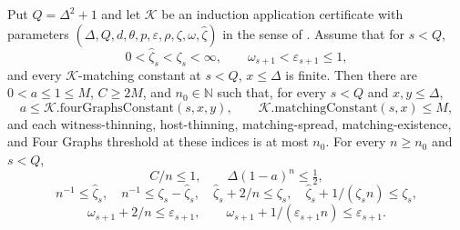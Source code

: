 \begin{lemma}
Put $Q=\Delta^2+1$ and let $\mathcal K$ be an induction application
certificate with parameters
$(\Delta,Q,d,\theta,p,\varepsilon,\rho,\zeta,\omega,\widehat\zeta)$
in the sense of .
Assume that for $s<Q$,
\[
 0<\widehat\zeta_s<\zeta_s<\infty,\qquad
 \omega_{s+1}<\varepsilon_{s+1}\leq1,
\]
and every $\mathcal K$-matching constant at $s<Q$, $x\leq\Delta$ is
finite. Then there are $0<a\leq1\leq M$, $C\geq2M$, and
$n_0\in\mathbb N$ such that, for every $s<Q$ and $x,y\leq\Delta$,
\[
 a\leq\mathcal K.\mathrm{fourGraphsConstant}(s,x,y),\qquad
 \mathcal K.\mathrm{matchingConstant}(s,x)\leq M,
\]
and each witness-thinning, host-thinning, matching-spread,
matching-existence, and Four Graphs threshold at these indices is at
most $n_0$. For every $n\geq n_0$ and $s<Q$,
\[
 C/n\leq1,\qquad \Delta(1-a)^n\leq\tfrac12,
\]
\[
 n^{-1}\leq\widehat\zeta_s,\quad
 n^{-1}\leq\zeta_s-\widehat\zeta_s,\quad
 \widehat\zeta_s+2/n\leq\zeta_s,\quad
 \widehat\zeta_s+1/(\zeta_s n)\leq\zeta_s,
\]
\[
 \omega_{s+1}+2/n\leq\varepsilon_{s+1},\qquad
 \omega_{s+1}+1/(\varepsilon_{s+1}n)\leq\varepsilon_{s+1}.
\]
\end{lemma}
